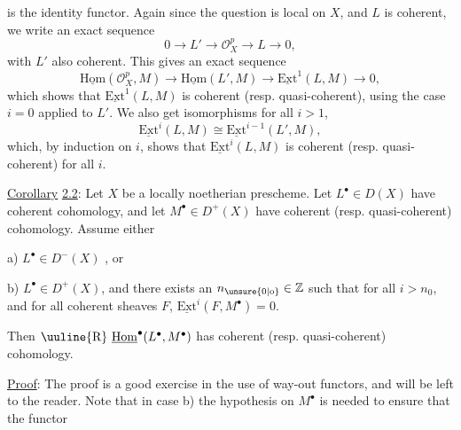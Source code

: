 is the identity functor. Again since the question is local on $X$, and $L$ is coherent, we write an exact sequence
\[
0\longrightarrow L'\longrightarrow\mathscr{O}_X^p\longrightarrow L\longrightarrow0,
\]
with $L'$ also coherent. This gives an exact sequence
\[
\underline{\mathrm{Hom}}(\mathscr{O}_X^p,M)\longrightarrow\underline{\mathrm{Hom}}(L',M)\longrightarrow\underline{\mathrm{Ext}}^1(L,M)\longrightarrow0,
\]
which shows that $\underline{\mathrm{Ext}}^1(L,M)$ is coherent (resp. quasi-coherent), using the case $i=0$ applied to $L'$. We also get isomorphisms for all $i>1$,
\[
\underline{\mathrm{Ext}}^i(L,M)\cong\underline{\mathrm{Ext}}^{i-1}(L',M),
\]
which, by induction on $i$, shows that $\underline{\mathrm{Ext}}^i(L,M)$ is coherent (resp. quasi-coherent) for all $i$.

\uline{Corollary} \uline{2.2}: Let $X$ be a locally noetherian prescheme. Let $L^\bullet\in D(X)$ have coherent cohomology, and let $M^\bullet\in D^+(X)$ have coherent (resp. quasi-coherent) cohomology. Assume either

a) $L^\bullet\in D^-(X)$ , \qquad or

b) $L^\bullet\in D^+(X)$, and there exists an $n_{\unsure{0|\mathrm{o}}}\in\mathbb{Z}$ such that for all $i>n_0$, and for all coherent sheaves $F$, $\underline{\mathrm{Ext}}^i(F,M^\bullet)=0$.

Then $\text{\uuline{R}}\ \underline{\mathrm{Hom}}^\bullet(L^\bullet,M^\bullet)$ has coherent (resp. quasi-coherent) cohomology.

\uline{Proof}: The proof is a good exercise in the use of way-out functors, and will be left to the reader. Note that in case b) the hypothesis on $M^\bullet$ is needed to ensure that the functor

